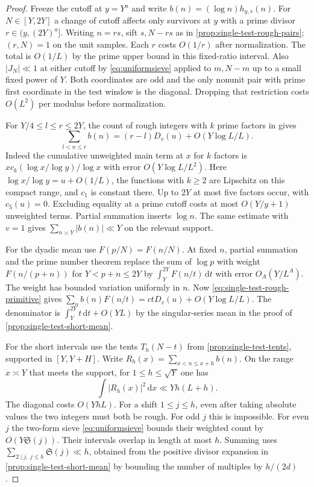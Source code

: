 \documentclass[11pt,a4paper]{article}
\numberwithin{equation}{section}
\newcommand{\SSS}{\mathfrak S}
\newcommand{\ud}{\mathrm d}
\begin{document}
\begin{proof}
Freeze the cutoff at $y=Y^a$ and write $b(n)=(\log n)h_{y,v}(n)$.
For $N\in[Y,2Y]$ a change of cutoff affects only survivors at
$y$ with a prime divisor $r\in(y,(2Y)^a]$. Writing $n=rs$,
sift $s,N-rs$ as in \cref{prop:single-test-rough-pairs};
$(r,N)=1$ on the unit samples. Each $r$ costs $O(1/r)$ after
normalization. The total is $O(1/L)$ by the prime upper bound
in this fixed-ratio interval. Also $|J_N|\ll1$ at either cutoff
by \eqref{eq:uniformsieve} applied to $m,N-m$ up to a small
fixed power of $Y$. Both coordinates are odd and the only
nonunit pair with prime first coordinate in the test window is
the diagonal. Dropping that restriction costs $O(L^2)$ per
modulus before normalization.

For $Y/4\le l\le r\le2Y$, the count of rough integers with $k$
prime factors in \cite[Lemma~2.2]{MatomakiZunigaSwitching} gives
\begin{equation}
 \sum_{l<n\le r} b(n)=(r-l)D_v(u)+O(Y\log L/L).
 \label{eq:single-test-rough-primitive}
\end{equation}
Indeed the cumulative unweighted main term at $x$ for $k$ factors
is $x c_k(\log x/\log y)/\log x$ with error $O(Y\log L/L^2)$.
Here $\log x/\log y=u+O(1/L)$, the functions with $k\ge2$
are Lipschitz on this compact range, and $c_1$ is constant
there. Up to $2Y$ at most five factors occur, with $c_5(u)=0$.
Excluding equality at a prime cutoff costs at most $O(Y/y+1)$
unweighted terms. Partial summation inserts $\log n$.
The same estimate with $v=1$ gives $\sum_{n\asymp Y}|b(n)|\ll Y$
on the relevant support.

For the dyadic mean use $F(p/N)=F(n/N)$. At fixed $n$, partial
summation and the prime number theorem replace the sum of $\log p$
with weight $F(n/(p+n))$ for $Y<p+n\le2Y$ by
$\int_Y^{2Y}F(n/t)\,\ud t$ with error $O_A(Y/L^A)$.
The weight has bounded variation uniformly in $n$. Now
\eqref{eq:single-test-rough-primitive} gives
$\sum_n b(n)F(n/t)=ctD_v(u)+O(Y\log L/L)$.
The denominator is $\int_Y^{2Y}t\,\ud t+O(YL)$ by the
singular-series mean in the proof of \cref{prop:single-test-short-mean}.

For the short intervals use the tents $T_h(N-t)$ from
\cref{prop:single-test-tents}, supported in $[Y,Y+H]$.
Write $R_h(x)=\sum_{x<n\le x+h}b(n)$. On the range $x\asymp Y$
that meets the support, for $1\le h\le\sqrt Y$ one has
\[
 \int |R_h(x)|^2\,\ud x\ll Yh(L+h).
\]
The diagonal costs $O(YhL)$. For a shift $1\le j\le h$, even
after taking absolute values the two integers must both be rough.
For odd $j$ this is impossible. For even $j$ the two-form sieve
\eqref{eq:uniformsieve} bounds their weighted count by
$O(Y\SSS(j))$. Their intervals overlap in length at most $h$.
Summing uses $\sum_{2\mid j,\ j\le h}\SSS(j)\ll h$, obtained
from the positive divisor expansion in \cref{prop:single-test-short-mean}
by bounding the number of multiples by $h/(2d)$.


\end{proof}
\end{document}
